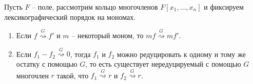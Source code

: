 \begin{claim}
\label{claim::ReductionProps}
Пусть $F$ -- поле, рассмотрим кольцо многочленов  $F[x_1,\ldots,x_n]$ и фиксируем лексикографический порядок на мономах.
\begin{enumerate}
\item Если $f\stackrel{G}{\rightsquigarrow}f'$ и $m$ -- некоторый моном, то $mf \stackrel{G}{\rightsquigarrow}mf'$.

\item Если $f_1 - f_2 \stackrel{G}{\rightsquigarrow}0$, тогда $f_1$ и $f_2$ можно редуцировать к одному и тому же остатку с помощью $G$, то есть существует нередуцируемый с помощью $G$ многочлен $r$ такой, что $f_1\stackrel{G}{\rightsquigarrow}r$ и $f_2\stackrel{G}{\rightsquigarrow}r$.
\end{enumerate}
\end{claim}
